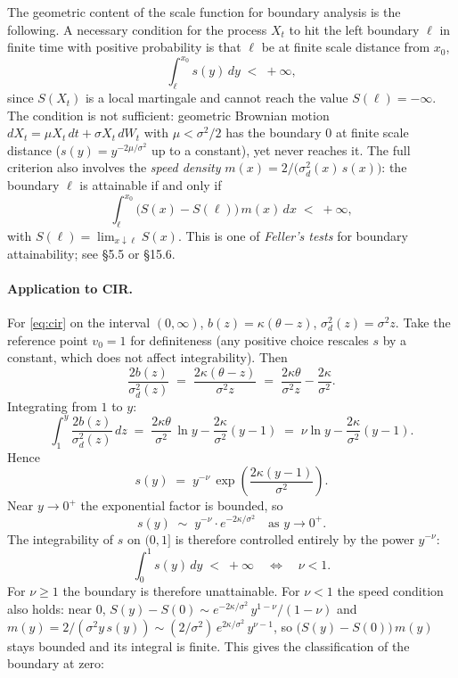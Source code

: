 \documentclass[11pt]{article}
\theoremstyle{plain}
\theoremstyle{definition}
\theoremstyle{remark}
\begin{document}
The geometric content of the scale function for boundary analysis is the following. A necessary condition for the process \(X_t\) to hit the left boundary \(\ell\) in finite time with positive probability is that \(\ell\) be at finite scale distance from \(x_0\),
\[
    \int_\ell^{x_0} s(y)\,dy \;<\; +\infty,
\]
since \(S(X_t)\) is a local martingale and cannot reach the value \(S(\ell) = -\infty\). The condition is not sufficient: geometric Brownian motion \(dX_t = \mu X_t\,dt + \sigma X_t\,dW_t\) with \(\mu < \sigma^2/2\) has the boundary \(0\) at finite scale distance (\(s(y) = y^{-2\mu/\sigma^2}\) up to a constant), yet never reaches it. The full criterion also involves the \emph{speed density} \(m(x) = 2/\bigl(\sigma_d^2(x)\, s(x)\bigr)\): the boundary \(\ell\) is attainable if and only if
\[
    \int_\ell^{x_0} \bigl(S(x) - S(\ell)\bigr)\, m(x)\,dx \;<\; +\infty,
\]
with \(S(\ell) = \lim_{x \downarrow \ell} S(x)\). This is one of \emph{Feller's tests} for boundary attainability; see \cite{KaratzasShreve1991} \S5.5 or \cite{KarlinTaylor1981} \S15.6.

\paragraph{Application to CIR.}
For \eqref{eq:cir} on the interval \((0, \infty)\), \(b(z) = \kappa(\theta - z)\), \(\sigma_d^2(z) = \sigma^2 z\). Take the reference point \(v_0 = 1\) for definiteness (any positive choice rescales \(s\) by a constant, which does not affect integrability). Then
\[
    \frac{2 b(z)}{\sigma_d^2(z)} \;=\; \frac{2\kappa(\theta - z)}{\sigma^2 z} \;=\; \frac{2\kappa\theta}{\sigma^2 z} - \frac{2\kappa}{\sigma^2}.
\]
Integrating from \(1\) to \(y\):
\[
    \int_1^y \frac{2 b(z)}{\sigma_d^2(z)}\,dz \;=\; \frac{2\kappa\theta}{\sigma^2}\,\ln y - \frac{2\kappa}{\sigma^2}(y - 1) \;=\; \nu \ln y - \frac{2\kappa}{\sigma^2}(y - 1).
\]
Hence
\begin{equation}
    s(y) \;=\; y^{-\nu}\,\exp\!\left(\frac{2\kappa(y - 1)}{\sigma^2}\right).                          \label{eq:cir-scale-density}
\end{equation}
Near \(y \to 0^+\) the exponential factor is bounded, so
\[
    s(y) \;\sim\; y^{-\nu} \cdot e^{-2\kappa/\sigma^2} \quad \text{as } y \to 0^+.
\]
The integrability of \(s\) on \((0, 1]\) is therefore controlled entirely by the power \(y^{-\nu}\):
\[
    \int_0^1 s(y)\,dy \;<\; +\infty \quad \iff \quad \nu < 1.
\]
For \(\nu \geq 1\) the boundary is therefore unattainable. For \(\nu < 1\) the speed condition also holds: near \(0\), \(S(y) - S(0) \sim e^{-2\kappa/\sigma^2}\, y^{1-\nu}/(1 - \nu)\) and \(m(y) = 2/(\sigma^2 y\, s(y)) \sim (2/\sigma^2)\, e^{2\kappa/\sigma^2}\, y^{\nu - 1}\), so \(\bigl(S(y) - S(0)\bigr)\, m(y)\) stays bounded and its integral is finite. This gives the classification of the boundary at zero:
\end{document}
